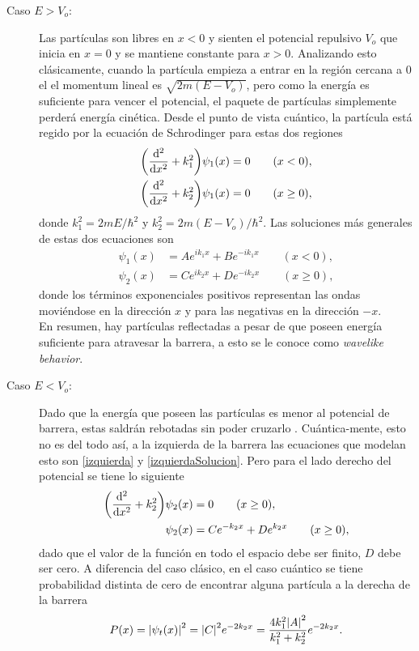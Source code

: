 \begin{description}
    \item[Caso $E > V_o$: ] Las partículas son libres en $x<0$ y sienten el potencial repulsivo $V_o$ que inicia en $x = 0$ y se mantiene constante para $x > 0$. Analizando esto clásicamente, cuando la partícula empieza a entrar en la región cercana a $0$ el el momentum lineal es $\sqrt{2m (E - V_o)}$, pero como la energía es suficiente para vencer el potencial, el paquete de partículas simplemente perderá energía cinética. Desde el punto de vista cuántico, la partícula está regido por la ecuación de Schrodinger para estas dos regiones
    \begin{align}
        \qty(\dv[2]{x} + k_1 ^2) \psi _1 (x) &= 0 \qquad (x < 0), \label{izquierda} \\
        \qty(\dv[2]{x} + k_2 ^2) \psi _1 (x) &= 0 \qquad (x \geq 0),
    \end{align}
    donde $k_1 ^2 = 2mE/\hbar ^2$ y $k_2 ^2 = 2m (E - V_o)/\hbar ^2$. Las soluciones más generales de estas dos ecuaciones son
    \begin{align}
        \psi _1 (x) &= Ae^{ik_1 x} + Be^{-ik_1 x} \qquad (x < 0), \label{izquierdaSolucion} \\ 
        \psi _2 (x) &= Ce^{ik_2 x} + De^{-ik_2 x} \qquad (x \geq 0),
    \end{align}
    donde los términos exponenciales positivos representan las ondas moviéndose en la dirección $x$ y para las negativas en la dirección $-x$. \\
    En resumen, hay partículas reflectadas a pesar de que poseen energía suficiente para atravesar la barrera, a esto se le conoce como \textit{wavelike behavior}. 
    \item[Caso $E < V_o$: ] Dado que la energía que poseen las partículas es menor al potencial de barrera, estas saldrán rebotadas sin poder cruzarlo . Cuántica-mente, esto no es del todo así, a la izquierda de la barrera las ecuaciones que modelan esto son \eqref{izquierda} y \eqref{izquierdaSolucion}. Pero para el lado derecho del potencial se tiene lo siguiente
        \begin{align}
            \qty(\dv[2]{x} + k_2 ^2) \psi _2 (x) &= 0 \qquad (x \geq 0), \\
            \psi _2 (x) &= Ce^{-k_2 x} + De^{k_2 x} \qquad (x \geq 0),
        \end{align}
    dado que el valor de la función en todo el espacio debe ser finito, $D$ debe ser cero. A diferencia del caso clásico, en el caso cuántico se tiene probabilidad distinta de cero de encontrar alguna partícula a la derecha de la barrera
        $$ P(x) = \abs{\psi _t (x)}^2 = \abs{C}^2 e^{-2k_2 x} = \frac{4k_1 ^2 \abs{A}^2}{k_1 ^2 + k_2 ^2} e^{-2k_2 x}. $$
\end{description}

